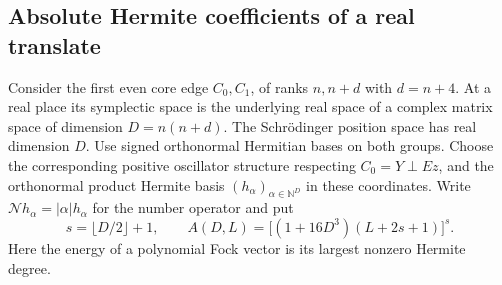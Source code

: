\documentclass[a4paper,11pt]{article}
\theoremstyle{definition}
\theoremstyle{remark}
\numberwithin{equation}{section}
\begin{document}
\subsection{Absolute Hermite coefficients of a real translate}\label{nav:VII-41}
Consider the first even core edge \(C_0,C_1\), of ranks \(n,n+d\)
with \(d=n+4\). At a real place its symplectic space is the
underlying real space of a complex matrix space of dimension
\(D=n(n+d)\). The Schr\"odinger position space has real dimension
\(D\). Use signed orthonormal Hermitian bases on both groups.
Choose the corresponding positive oscillator structure respecting
\(C_0=Y\perp Ez\), and the orthonormal product Hermite basis
\((h_\alpha)_{\alpha\in\mathbb N^D}\) in these coordinates.
Write \(\mathcal N h_\alpha=|\alpha|h_\alpha\) for the number
operator and put
\[
 s=\lfloor D/2\rfloor+1,\qquad
 A(D,L)=\big[(1+16D^3)(L+2s+1)\big]^s .
\]
Here the energy of a polynomial Fock vector is its largest
nonzero Hermite degree.
\end{document}
